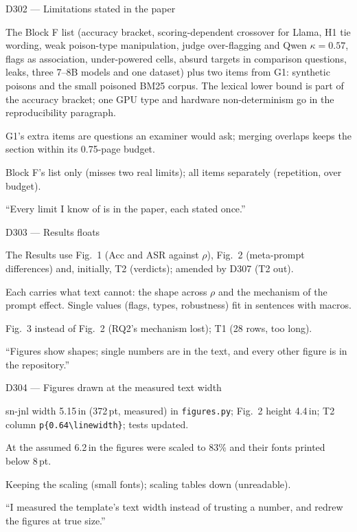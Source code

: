 \documentclass[11pt,a4paper]{report}
\begin{document}
\begin{decisionbox}{D302 --- Limitations stated in the paper}
\begin{description}[nosep, leftmargin=0pt]
  \item[Decision.] The Block F list (accuracy bracket, scoring-dependent crossover for Llama, H1 tie wording, weak poison-type manipulation, judge over-flagging and Qwen $\kappa=0.57$, flags as association, under-powered cells, absurd targets in comparison questions, leaks, three 7--8B models and one dataset) plus two items from G1: synthetic poisons and the small poisoned BM25 corpus. The lexical lower bound is part of the accuracy bracket; one GPU type and hardware non-determinism go in the reproducibility paragraph.
  \item[Why.] G1's extra items are questions an examiner would ask; merging overlaps keeps the section within its 0.75-page budget.
  \item[Alternatives.] Block F's list only (misses two real limits); all items separately (repetition, over budget).
  \item[Interview line.] ``Every limit I know of is in the paper, each stated once.''
\end{description}
\end{decisionbox}
\begin{decisionbox}{D303 --- Results floats}
\begin{description}[nosep, leftmargin=0pt]
  \item[Decision.] The Results use Fig.~1 (Acc and ASR against $\rho$), Fig.~2 (meta-prompt differences) and, initially, T2 (verdicts); amended by D307 (T2 out).
  \item[Why.] Each carries what text cannot: the shape across $\rho$ and the mechanism of the prompt effect. Single values (flags, types, robustness) fit in sentences with macros.
  \item[Alternatives.] Fig.~3 instead of Fig.~2 (RQ2's mechanism lost); T1 (28 rows, too long).
  \item[Interview line.] ``Figures show shapes; single numbers are in the text, and every other figure is in the repository.''
\end{description}
\end{decisionbox}

\begin{decisionbox}{D304 --- Figures drawn at the measured text width}
\begin{description}[nosep, leftmargin=0pt]
  \item[Decision.] sn-jnl width 5.15\,in (372\,pt, measured) in \texttt{figures.py}; Fig.~2 height 4.4\,in; T2 column \verb|p{0.64\linewidth}|; tests updated.
  \item[Why.] At the assumed 6.2\,in the figures were scaled to 83\% and their fonts printed below 8\,pt.
  \item[Alternatives.] Keeping the scaling (small fonts); scaling tables down (unreadable).
  \item[Interview line.] ``I measured the template's text width instead of trusting a number, and redrew the figures at true size.''
\end{description}
\end{decisionbox}
\end{document}
